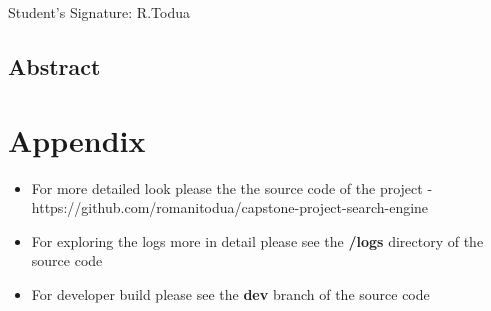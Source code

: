 \documentclass[12pt]{report}
\begin{document}
Student's Signature: R.Todua
\clearpage

\begin{center}
    \chapter*{Abstract} 
\end{center}

\newpage

\tableofcontents
\renewcommand{\tableofcontents}{
    {
        \clearpage
        \pdfbookmark[0]{\contentsname}{contents}
        \setlength{\parskip}{0pt}
        \setcounter{tocdepth}{1}
        \default@tableofcontents
        \markboth{\contentsname}{\contentsname}
    }
    \pagebreak%
}


\newpage

\clearpage


\clearpage


\clearpage


\clearpage


\appendix
\chapter{Appendix}
\begin{itemize}
    \item For more detailed look please the the source code of the project - \\ https://github.com/romanitodua/capstone-project-search-engine
    \item For exploring the logs more in detail please see the \textbf{/logs} directory of the source code
    \item For developer build please see the \textbf{dev} branch of the source code
\end{itemize}

\printbibliography[heading=bibintoc] 
\end{document}
